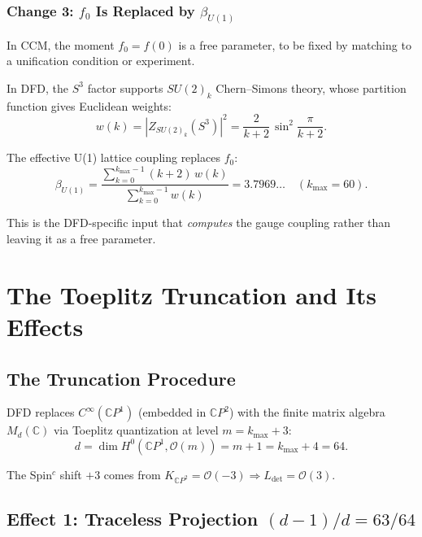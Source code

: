 \documentclass[12pt,a4paper]{article}
\begin{document}
\subsubsection{Change 3: $f_0$ Is Replaced by $\beta_{U(1)}$}

In CCM, the moment $f_0 = f(0)$ is a free parameter, to be fixed by
matching to a unification condition or experiment.

In DFD, the $S^3$ factor supports $SU(2)_k$ Chern--Simons theory, whose
partition function gives Euclidean weights:
\begin{equation}
w(k) = |Z_{SU(2)_k}(S^3)|^2 = \frac{2}{k+2}\,\sin^2\!\frac{\pi}{k+2}.
\end{equation}

The effective U(1) lattice coupling replaces $f_0$:
\begin{equation}\label{eq:beta-def}
\beta_{U(1)} = \frac{\sum_{k=0}^{k_{\max}-1}(k+2)\,w(k)}{\sum_{k=0}^{k_{\max}-1}w(k)}
= 3.7969\ldots \quad (k_{\max} = 60).
\end{equation}

This is the DFD-specific input that \emph{computes} the gauge coupling
rather than leaving it as a free parameter.

\section{The Toeplitz Truncation and Its Effects}
\label{sec:toeplitz}

\subsection{The Truncation Procedure}

DFD replaces $C^\infty(\mathbb{C}P^1)$ (embedded in $\mathbb{C}P^2$) with
the finite matrix algebra $M_d(\mathbb{C})$ via Toeplitz quantization at
level $m = k_{\max} + 3$:
\begin{equation}
d = \dim H^0(\mathbb{C}P^1, \mathcal{O}(m)) = m + 1 = k_{\max} + 4 = 64.
\end{equation}

The Spin$^c$ shift $+3$ comes from $K_{\mathbb{C}P^2} = \mathcal{O}(-3)
\Rightarrow L_{\det} = \mathcal{O}(3)$.

\subsection{Effect 1: Traceless Projection $(d-1)/d = 63/64$}
\end{document}
